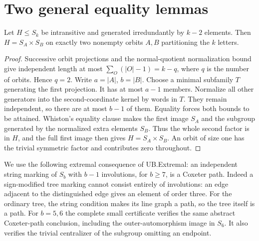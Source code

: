 \section{Two general equality lemmas}
\begin{lemma}\label{intransitive}
Let $H\leq S_k$ be intransitive and generated irredundantly by $k-2$
elements. Then $H=S_A\times S_B$ on exactly two nonempty orbits
$A,B$ partitioning the $k$ letters.
\end{lemma}
\begin{proof}
Successive orbit projections and the normal-quotient normalization
bound give independent length at most $\sum_O(|O|-1)=k-q$, where
$q$ is the number of orbits. Hence $q=2$. Write $a=|A|$, $b=|B|$.
Choose a minimal subfamily $T$ generating the first projection. It
has at most $a-1$ members. Normalize all other generators into the
second-coordinate kernel by words in $T$. They remain independent,
so there are at most $b-1$ of them. Equality forces both bounds to
be attained. Whiston's equality clause makes the first image $S_A$
and the subgroup generated by the normalized extra elements $S_B$.
Thus the whole second factor is in $H$, and the full first image
then gives $H=S_A\times S_B$. An orbit of size one has the trivial
symmetric factor and contributes zero throughout.
\end{proof}

We use the following extremal consequence of UB.Extremal: an independent
string marking of $S_b$ with $b-1$ involutions, for $b\geq7$, is a Coxeter
path. Indeed a sign-modified tree marking cannot consist entirely of
involutions: an edge adjacent to the distinguished edge gives an
element of order three. For the ordinary tree, the string condition
makes its line graph a path, so the tree itself is a path. For $b=5,6$
the complete small certificate verifies the same abstract Coxeter-path
conclusion, including the outer-automorphism image in $S_6$. It also
verifies the trivial centralizer of the subgroup omitting an endpoint.

